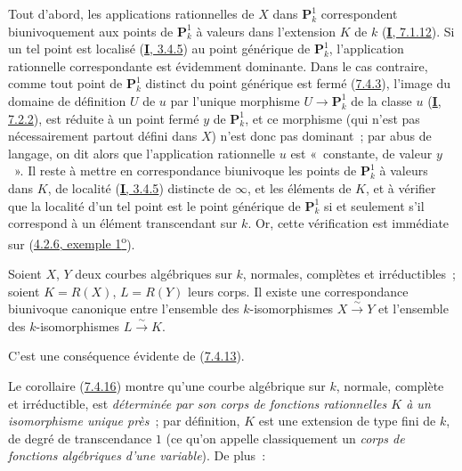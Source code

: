 Tout d'abord, les applications rationnelles de $X$ dans $\mathbf{P}_k^1$
correspondent biunivoquement aux points de $\mathbf{P}_k^1$ à valeurs dans
l'extension $K$ de $k$ (\hyperref[I.7.1.12-fr]{\textbf{I}, 7.1.12}). Si un tel point
est localisé (\hyperref[I.3.4.5-fr]{\textbf{I}, 3.4.5}) au point générique de
$\mathbf{P}_k^1$, l'application rationnelle correspondante est évidemment
dominante. Dans le cas contraire, comme tout point de $\mathbf{P}_k^1$
distinct du point générique est fermé (\hyperref[II.7.4.3-fr]{7.4.3}),
l'image du domaine de définition $U$ de $u$ par l'unique morphisme
$U\to\mathbf{P}_k^1$ de la classe $u$ (\hyperref[I.7.2.2-fr]{\textbf{I}, 7.2.2}),
est réduite à un point fermé $y$ de $\mathbf{P}_k^1$, et ce morphisme (qui
n'est pas nécessairement partout défini dans $X$) n'est donc pas dominant~;
par abus de langage, on dit alors que l'application rationnelle $u$ est
«~constante, de valeur $y$~». Il reste à mettre en correspondance biunivoque
les points de $\mathbf{P}_k^1$ à valeurs dans $K$, de localité
(\hyperref[I.3.4.5-fr]{\textbf{I}, 3.4.5}) distincte de $\infty$, et les éléments de
$K$, et à vérifier que la localité d'un tel point est le point générique de
$\mathbf{P}_k^1$ si et seulement s'il correspond à un
élément transcendant sur $k$. Or, cette vérification est immédiate sur
(\hyperref[II.4.2.6-fr]{4.2.6, exemple 1\textsuperscript{o}}).

\begin{corollary}[7.4.16]
\label{II.7.4.16-fr}
Soient $X$, $Y$ deux courbes algébriques sur $k$, \textup{normales, complètes} et
irréductibles~; soient $K=R(X)$, $L=R(Y)$ leurs corps. Il existe une
correspondance biunivoque canonique entre l'ensemble des $k$-isomorphismes
$X\xrightarrow{\sim}Y$ et l'ensemble des $k$-isomorphismes
$L\xrightarrow{\sim}K$.
\end{corollary}

C'est une conséquence évidente de (\hyperref[II.7.4.13-fr]{7.4.13}).

\begin{env}[7.4.17]
\label{II.7.4.17-fr}
Le corollaire (\hyperref[II.7.4.16-fr]{7.4.16}) montre qu'une courbe algébrique
sur $k$, normale, complète et irréductible, est \emph{déterminée par son corps
de fonctions rationnelles $K$ à un isomorphisme unique près}~; par définition,
$K$ est une extension de type fini de $k$, de degré de transcendance $1$ (ce
qu'on appelle classiquement un \emph{corps de fonctions algébriques d'une
variable}). De plus~:
\end{env}

